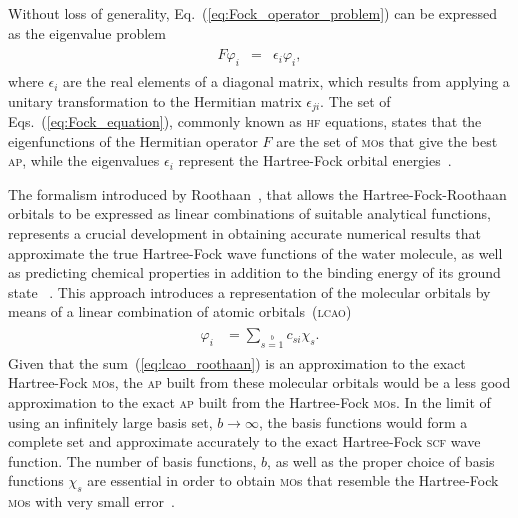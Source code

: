 %
Without loss of generality, Eq.~(\ref{eq:Fock_operator_problem}) can
be expressed as the eigenvalue problem
%
\begin{eqnarray}
  \begin{split}
    F \varphi_{i} & = & \epsilon_{i} \varphi_{i},
  \end{split}
  \label{eq:Fock_equation}
\end{eqnarray}
%
where $\epsilon_{i}$ are the real elements of a diagonal matrix, which
results from applying a unitary transformation to the Hermitian matrix
$\epsilon_{ji}$. The set of Eqs.~(\ref{eq:Fock_equation}), commonly
known as \textsc{hf} equations, states that the eigenfunctions of the
Hermitian operator $F$ are the set of \textsc{mo}s that give the best
\textsc{ap}, while the eigenvalues $\epsilon_{i}$ represent the
Hartree-Fock orbital energies~\cite{Roothaan_HF}.

The formalism introduced by Roothaan~\cite{Roothaan_HF}, that allows
the Hartree-Fock-Roothaan orbitals to be expressed as linear
combinations of suitable analytical functions, represents a crucial
development in obtaining accurate numerical results that approximate
the true Hartree-Fock wave functions of the water molecule, as well as
predicting chemical properties in addition to the binding energy of
its ground state
~\cite{scf_lc_1967,EllisonShullh2o_1955,Neumann_gaussian_1968,Pitzer_1970,Pitzer_1972}.
This approach introduces a representation of the molecular orbitals by
means of a linear combination of atomic
orbitals~(\textsc{lcao})~\cite{Roothaan_HF}
%
\begin{eqnarray}
  \begin{split}
    \varphi_{i} & = \sum\limits_{s=1}\limits^{b} c_{si} \chi_{s}.
  \end{split}
  \label{eq:lcao_roothaan}
\end{eqnarray}
%
Given that the sum~(\ref{eq:lcao_roothaan}) is an approximation to the
exact Hartree-Fock \textsc{mo}s, the \textsc{ap} built from these
molecular orbitals would be a less good approximation to the exact
\textsc{ap} built from the Hartree-Fock \textsc{mo}s. In the limit of
using an infinitely large basis set, $b\to\infty$, the basis functions
would form a complete set and approximate accurately to the exact
Hartree-Fock \textsc{scf} wave function. The number of basis
functions, $b$, as well as the proper choice of basis functions
$\chi_{s}$ are essential in order to obtain \textsc{mo}s that resemble
the Hartree-Fock \textsc{mo}s with very small
error~\cite{Moccia_JCP_2164,Moccia_JCP_2176,Moccia_1964}.

